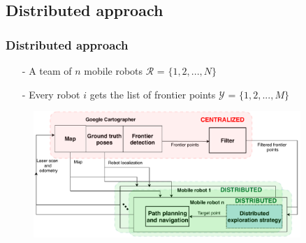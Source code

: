 \subsection{Distributed approach}
\begin{frame}
	\frametitle{Distributed approach}
	\begin{itemize}
		\item[-] A team of $n$ mobile robots  \(\text{$\mathcal {R}$}\) = $ \{ 1, 2,..., N\}$
		\item[-] Every robot $i$ gets the list of frontier points  \(\text{$\mathcal {Y}$}\) = $ \{ 1, 2,..., M\}$
	\end{itemize}
	
	\begin{figure}
		\centering
		\includegraphics[width=0.9\textwidth]{figures/diagram_exploration}
	\end{figure}
\end{frame}

